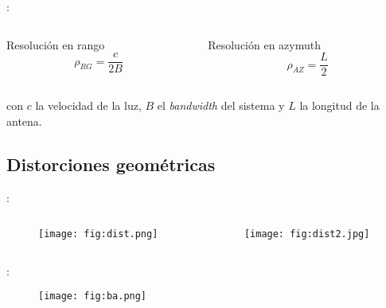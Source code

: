 \begin{frame}{\secname : \subsecname}
  \begin{columns}
    \begin{column}{0.5\textwidth}
     \begin{block}{Resolución en rango}
      \begin{equation}
        \rho_{RG} = \frac{c}{2B}
      \end{equation}
     \end{block}
    \end{column}
    \begin{column}{0.5\textwidth}  %
      \begin{block}{Resolución en azymuth}
        \begin{equation}
          \rho_{AZ} = \frac{L}{2}
        \end{equation}
      \end{block}
    \end{column}
    \end{columns}
    con $c$ la velocidad de la luz, $B$ el \emph{bandwidth} del sistema y $L$ la longitud de la antena.
\end{frame}

\subsection{Distorciones geométricas}

\begin{frame}{\secname : \subsecname}
  \begin{columns}[t]
    \begin{column}{0.5\textwidth}
      \begin{figure}
        \centering
        \texttt{[image: fig:dist.png]}
        \caption{}
        \label{}
      \end{figure}
    \end{column}
    \begin{column}{0.5\textwidth}  %
        \begin{figure}
          \centering
          \texttt{[image: fig:dist2.jpg]}
          \caption{}
          \label{}
        \end{figure}
    \end{column}
    \end{columns}
\end{frame}

\begin{frame}{\secname : \subsecname}
    \begin{figure}
      \centering
      \texttt{[image: fig:ba.png]}
      \caption{}
      \label{}
    \end{figure}
\end{frame}

